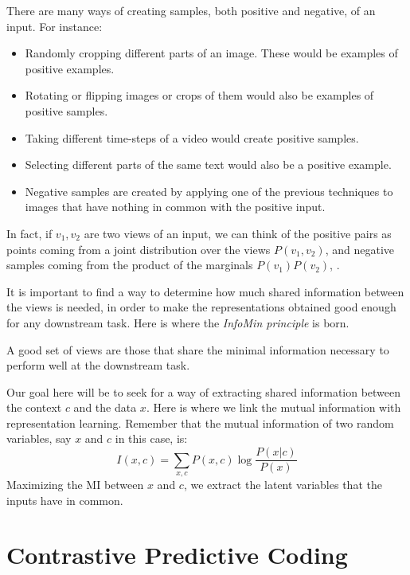 There are many ways of creating samples, both positive and negative, of an input. For instance:
\begin{itemize}
    \item Randomly cropping different parts of an image. These would be examples of positive examples.
    \item Rotating or flipping images or crops of them would also be examples of positive samples.
    
    \item Taking different time-steps of a video would create positive samples.
    \item Selecting different parts of the same text would also be a positive example.    
    \item Negative samples are created by applying one of the previous techniques to images that have nothing in common with the positive input.
\end{itemize}

In fact, if $v_1,v_2$ are two views of an input, we can think of the positive pairs as points coming from a joint distribution over the views $P(v_1,v_2)$, and negative samples coming from the product of the marginals $P(v_1)P(v_2)$, \citep{tian_what_2020}.

It is important to find a way to determine how much shared information between the views is needed, in order to make the representations obtained good enough for any downstream task. Here is where the \emph{InfoMin principle} is born. 

\begin{ndefC}\label{def:infomin}
    A good set of views are those that share the minimal information necessary to perform well at the downstream task.
\end{ndefC} 


Our goal here will be to seek for a way of extracting shared information between the context $c$ and the data $x$. Here is where we link the mutual information with representation learning. Remember that the mutual information of two random variables, say $x$ and $c$ in this case, is:
\begin{equation}\label{EQ:MI}
I(x,c) = \sum_{x,c}P(x,c)\log\frac{P(x|c)}{P(x)}
\end{equation}
Maximizing the MI between $x$ and $c$, we extract the latent variables that the inputs have in common. 

\section{Contrastive Predictive Coding}

